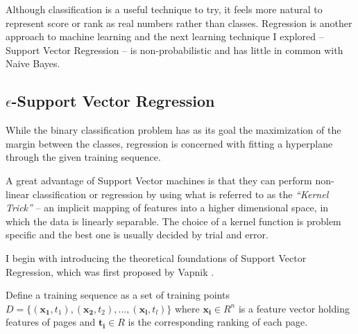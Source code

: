 \documentclass[12pt,notitlepage,twoside]{scrreprt}
\begin{document}
Although classification is a useful technique to try, it feels more natural to
represent score or rank as real numbers rather than classes. Regression is
another approach to machine learning and the next learning technique I explored
-- Support Vector Regression -- is non-probabilistic and has little in common
with Naive Bayes.

\subsection{$\epsilon$-Support Vector Regression}
\label{prep:svm}
While the binary classification problem has as its goal the maximization of the
margin between the classes, regression is concerned with fitting a hyperplane
through the given training sequence. 

A great advantage of Support Vector machines is that they can perform
non-linear classification or regression by using what is referred to as the
\textit{``Kernel Trick''} -- an implicit mapping of features into a higher
dimensional space, in which the data is linearly separable. The choice of a
kernel function is problem specific and the best one is usually decided by
trial and error.

I begin with introducing the theoretical foundations of Support Vector
Regression, which was first proposed by Vapnik \cite{stat_learn}.

Define a training sequence as a set of training points \(D = \{ (\mathbf{x_1},t_1),
(\mathbf{x_2},t_2), ... , (\mathbf{x_l},t_l) \}\) where \( \mathbf{x_i} \in R^n \) is a
feature vector holding features of pages and \( \mathbf{t_i} \in R \) is the corresponding
ranking of each page.
\end{document}
